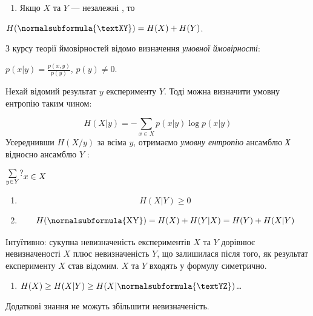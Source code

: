 \setcounter{saveenum}{\value{enumi}}
\begin{enumerate}
\setcounter{enumi}{\value{saveenum}}
\item Якщо $X$ та $Y$ --- незалежні , то
\end{enumerate}
{\centering
 $H(\normalsubformula{\textXY})=H(X)+H(Y)$.
\par}

З курсу теорії ймовірностей відомо визначення \textit{умовної ймовірності}:

{\centering
 $p\left(x |y \right)=\frac{p(x,y)}{p(y)}$,   $p(y)\neq 0$.
\par}

Нехай відомий результат  $y$ експерименту $Y$. Тоді можна визначити
умовну ентропію таким чином:

\begin{equation*}
{H\left(X |y \right)=-\underset{x\in X}{\sum
}{p\left(x |y \right)\log p\left(x |y \right)}}
\end{equation*}
Усереднивши  $H(X/y)$ за всіма  $y$, отримаємо \textit{умовну ентропію}
ансамблю  \textit{Х } відносно ансамблю $Y$ :

 $\begin{matrix}\underset{y\in Y}{\sum }?\hfill\null \end{matrix}{x\in
X}\hfill $

\liststyleWWviiiNumxxxix
\setcounter{saveenum}{\value{enumi}}
\begin{enumerate}
\setcounter{enumi}{\value{saveenum}}
\item \begin{equation*}
{H(X|Y)\ge 0}
\end{equation*}
\item \begin{equation*}
{H(\normalsubformula{\text{XY}})=H(X)+H(Y|X)=H(Y)+H(X|Y)}
\end{equation*}
\end{enumerate}
Інтуїтивно: сукупна невизначеність експериментів $X$ та $Y$
дорівнює невизначеності $X$ плюс невизначеність $Y$, що
залишилася після того, як результат експерименту $X$ став відомим.
$X$ та $Y$ входять у формулу симетрично.

\liststyleWWviiiNumxxxix
\setcounter{saveenum}{\value{enumi}}
\begin{enumerate}
\setcounter{enumi}{\value{saveenum}}
\item  $H(X)\ge H(X|Y)\ge H(X|\normalsubformula{\textYZ})$…
\end{enumerate}
Додаткові знання не можуть збільшити невизначеність.


